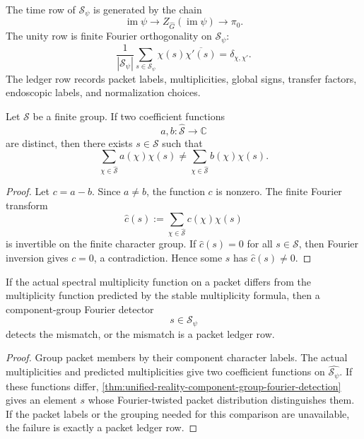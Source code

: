 \begin{definition}
\label{def:unified-reality-component-group-three-properties}
The time row of $\mathcal S_\psi$ is generated by the chain
$$
\operatorname{im}\psi
\longrightarrow
Z_{\widehat G}(\operatorname{im}\psi)
\longrightarrow
\pi_0.
$$
The unity row is finite Fourier orthogonality on $\mathcal S_\psi$:
$$
\frac{1}{|\mathcal S_\psi|}
\sum_{s\in\mathcal S_\psi}
\chi(s)\overline{\chi'(s)}
=
\delta_{\chi,\chi'}.
$$
The ledger row records packet labels, multiplicities, global signs,
transfer factors, endoscopic labels, and normalization choices.
\end{definition}

\begin{theorem}
\label{thm:unified-reality-component-group-fourier-detection}
Let $\mathcal S$ be a finite group. If two coefficient functions
$$
a,b:\widehat{\mathcal S}\to\mathbb C
$$
are distinct, then there exists $s\in\mathcal S$ such that
$$
\sum_{\chi\in\widehat{\mathcal S}}a(\chi)\chi(s)
\ne
\sum_{\chi\in\widehat{\mathcal S}}b(\chi)\chi(s).
$$
\end{theorem}
\begin{proof}
Let $c=a-b$. Since $a\ne b$, the function $c$ is nonzero. The finite
Fourier transform
$$
\widehat c(s)
:=
\sum_{\chi\in\widehat{\mathcal S}}c(\chi)\chi(s)
$$
is invertible on the finite character group. If $\widehat c(s)=0$ for
all $s\in\mathcal S$, then Fourier inversion gives $c=0$, a
contradiction. Hence some $s$ has $\widehat c(s)\ne0$.
\end{proof}

\begin{corollary}
\label{cor:unified-reality-packet-multiplicity-mismatch-detected}
If the actual spectral multiplicity function on a packet differs from
the multiplicity function predicted by the stable multiplicity formula,
then a component-group Fourier detector
$$
s\in\mathcal S_\psi
$$
detects the mismatch, or the mismatch is a packet ledger row.
\end{corollary}
\begin{proof}
Group packet members by their component character labels. The actual
multiplicities and predicted multiplicities give two coefficient
functions on $\widehat{\mathcal S_\psi}$. If these functions differ,
\autoref{thm:unified-reality-component-group-fourier-detection} gives
an element $s$ whose Fourier-twisted packet distribution distinguishes
them. If the packet labels or the grouping needed for this comparison
are unavailable, the failure is exactly a packet ledger row.
\end{proof}

